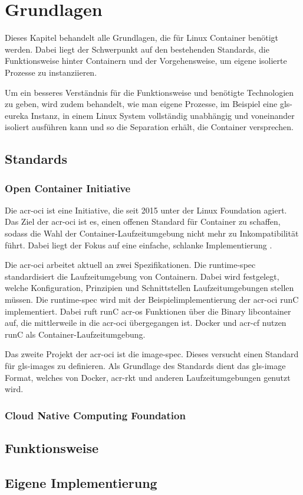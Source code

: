 \chapter{Grundlagen}
\label{chap:grundlagen}
Dieses Kapitel behandelt alle Grundlagen, die für Linux Container benötigt werden. Dabei liegt der Schwerpunkt auf den bestehenden Standards, die Funktionsweise hinter Containern und der Vorgehensweise, um eigene isolierte Prozesse zu instanziieren.

Um ein besseres Verständnis für die Funktionsweise und benötigte Technologien zu geben, wird zudem behandelt, wie man eigene Prozesse, im Beispiel eine \gls{gls-eureka} Instanz, in einem Linux System vollständig unabhängig und voneinander isoliert ausführen kann und so die Separation erhält, die Container versprechen.

\section{Standards}
\label{sec:standards}

\subsection{Open Container Initiative}
\label{sec:oci}
Die \gls{acr-oci} ist eine Initiative, die seit 2015 unter der Linux Foundation agiert. Das Ziel der \gls{acr-oci} ist es, einen offenen Standard für Container zu schaffen, sodass die Wahl der Container-Laufzeitumgebung nicht mehr zu Inkompatibilität führt. Dabei liegt der Fokus auf eine einfache, schlanke Implementierung \citep{OpenContainerInitiative}.

Die \gls{acr-oci}  arbeitet aktuell an zwei Spezifikationen. Die runtime-spec standardisiert die Laufzeitumgebung  von Containern. Dabei wird festgelegt, welche Konfiguration, Prinzipien und Schnittstellen Laufzeitumgebungen stellen müssen. Die runtime-spec wird mit der Beispielimplementierung der \gls{acr-oci} runC implementiert. Dabei ruft runC \gls{acr-os} Funktionen über die Binary libcontainer auf, die mittlerweile in die \gls{acr-oci} übergegangen ist. Docker und \gls{acr-cf} nutzen runC als Container-Laufzeitumgebung.

Das zweite Projekt der \gls{acr-oci} ist die image-spec. Dieses versucht einen Standard für \glspl{gls-image} zu definieren. Als Grundlage des Standards dient das \gls{gls-image} Format, welches von Docker, \gls{acr-rkt} und anderen Laufzeitumgebungen genutzt wird.

\subsection{Cloud Native Computing Foundation}
\label{sec:cncf}

\section{Funktionsweise}
\label{sec:funktionsweise}

\section{Eigene Implementierung}
\label{sec:eigeneImpl}